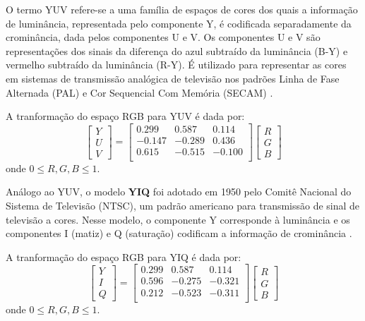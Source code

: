 O termo YUV refere-se a uma família de espaços de cores dos quais a informação de luminância, representada pelo componente Y, é codificada separadamente da crominância, dada pelos componentes U e V. Os componentes U e V são representações dos sinais da diferença do azul subtraído da luminância (B-Y) e vermelho subtraído da luminância (R-Y). É utilizado para representar as cores em sistemas de transmissão analógica de televisão nos padrões Linha de Fase Alternada (PAL) e Cor Sequencial Com Memória (SECAM) \citep{pedrini:08}.

A tranformação do espaço RGB para YUV é dada por:\\
\begin{equation}
  \begin{bmatrix}
    Y \\ U \\ V
  \end{bmatrix} = 
  \begin{bmatrix}
     0.299 &  0.587 &  0.114 \\
    -0.147 & -0.289 &  0.436 \\
     0.615 & -0.515 & -0.100 \\
  \end{bmatrix}
  \begin{bmatrix}
    R \\ G \\ B
  \end{bmatrix}
\end{equation}
onde $0 \leq R, G, B \leq 1$.

Análogo ao YUV, o modelo \textbf{YIQ} foi adotado em 1950 pelo Comitê Nacional do Sistema de Televisão (NTSC), um padrão americano para transmissão de sinal de televisão a cores. Nesse modelo, o componente Y corresponde à luminância e os componentes I (matiz) e Q (saturação) codificam a informação de crominância \citep{pedrini:08}.

A tranformação do espaço RGB para YIQ é dada por:\\
\begin{equation}
  \begin{bmatrix}
    Y \\ I \\ Q
  \end{bmatrix} = 
  \begin{bmatrix}
    0.299  &  0.587 &  0.114 \\
    0.596  & -0.275 & -0.321 \\
    0.212  & -0.523 & -0.311 \\
  \end{bmatrix}
  \begin{bmatrix}
    R \\ G \\ B
  \end{bmatrix}
\end{equation}
onde $0 \leq R, G, B \leq 1$.

